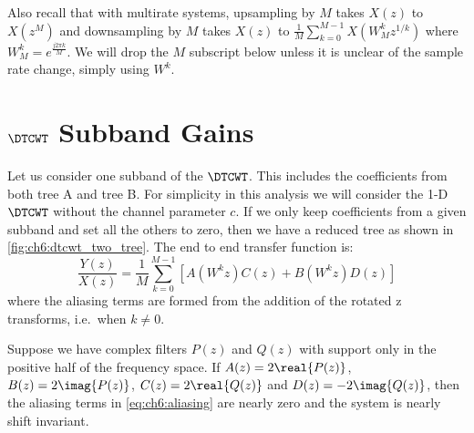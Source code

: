 Also recall that with multirate systems, upsampling by $M$ takes $X(z)$ to
$X(z^M)$ and downsampling by $M$ takes $X(z)$ to $\frac{1}{M}\sum_{k=0}^{M-1} X(W_M^k
z^{1/k})$ where $W_M^k = e^{\frac{j2\pi k}{M}}$. We will drop the $M$ subscript
below unless it is unclear of the sample rate change, simply using $W^k$.

\section{$\DTCWT$ Subband Gains}

\begin{figure}
  \centering
  
  \label{fig:ch6:dtcwt_two_tree}
\end{figure}

Let us consider one subband of the $\DTCWT$. This includes the coefficients from
both tree A and tree B. For simplicity in this analysis we will consider the 1-D
$\DTCWT$ without the channel parameter $c$. If we only keep coefficients from a given
subband and set all the others to zero, then we have a reduced tree as shown in
\autoref{fig:ch6:dtcwt_two_tree}. The end to end transfer function is:
%
\begin{equation}
  \frac{Y(z)}{X(z)} = \frac{1}{M} \sum_{k=0}^{M-1} \left[A(W^k z)C(z) + B(W^k z)D(z)\right]
  \label{eq:ch6:aliasing}
\end{equation}
%
where the aliasing terms are formed from the addition of the rotated z
transforms, i.e.\ when $k \neq 0$.

\begin{theorem} \label{thm:ch6:shiftinv}
  Suppose we have complex filters $P(z)$ and $Q(z)$ with support only in the
  positive half of the frequency space. If $A(z) = 2\real{P(z)}$, $B(z) =
  2\imag{P(z)}$, $C(z) = 2\real{Q(z)}$ and $D(z) = -2\imag{Q(z)}$, then the aliasing
  terms in \eqref{eq:ch6:aliasing} are nearly zero and the system is nearly
  shift invariant.
\end{theorem}

